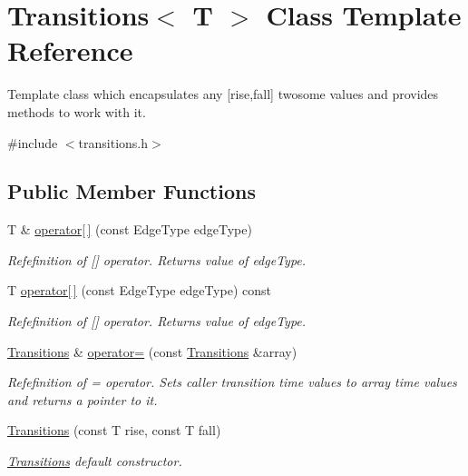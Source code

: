 \hypertarget{classTransitions}{\section{Transitions$<$ T $>$ Class Template Reference}
\label{classTransitions}
}


Template class which encapsulates any \mbox{[}rise,fall\mbox{]} twosome values and provides methods to work with it.  




{\ttfamily \#include $<$transitions.\-h$>$}

\subsection*{Public Member Functions}
\begin{DoxyCompactItemize}
\item 
T \& \hyperlink{classTransitions_a79a4be6a8415710583c6c811a27c3b9d}{operator\mbox{[}$\,$\mbox{]}} (const Edge\-Type edge\-Type)
\begin{DoxyCompactList}\small\item\em Refefinition of \mbox{[}\mbox{]} operator. Returns value of edge\-Type. \end{DoxyCompactList}\item 
T \hyperlink{classTransitions_af9dddcc4c48658b8adf8739ac139c34f}{operator\mbox{[}$\,$\mbox{]}} (const Edge\-Type edge\-Type) const 
\begin{DoxyCompactList}\small\item\em Refefinition of \mbox{[}\mbox{]} operator. Returns value of edge\-Type. \end{DoxyCompactList}\item 
\hyperlink{classTransitions}{Transitions} \& \hyperlink{classTransitions_a280ca4245034d6f298935392f8172cea}{operator=} (const \hyperlink{classTransitions}{Transitions} \&array)
\begin{DoxyCompactList}\small\item\em Refefinition of = operator. Sets caller transition time values to array time values and returns a pointer to it. \end{DoxyCompactList}\item 
\hyperlink{classTransitions_a0aae6de65968e98353b1fd9b6f394221}{Transitions} (const T rise, const T fall)
\begin{DoxyCompactList}\small\item\em \hyperlink{classTransitions}{Transitions} default constructor. \end{DoxyCompactList}\item 

\end{DoxyCompactItemize}
